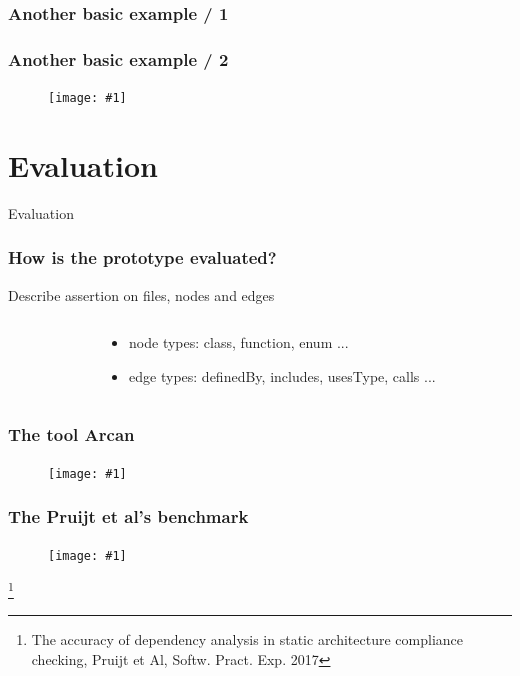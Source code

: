 \documentclass[table]{beamer}
\newcommand{\putimage}[2] {
  \begin{figure}[H]
    \centering
    \texttt{[image: \#1]}
	\end{figure}
}
\begin{document}
\begin{frame}[fragile]
  \frametitle{Another basic example / 1}
  
\end{frame}

\begin{frame}
  \frametitle{Another basic example / 2}
  \putimage{images/d2/dependency-graph-example.png}{0.99}
\end{frame}

\section{Evaluation}
\begin{frame}
  \centering
  \huge Evaluation
\end{frame}

\begin{frame}[fragile]
  \frametitle{How is the prototype evaluated?}
  Describe assertion on files, nodes and edges
  \begin{columns}
    \begin{column}{0.64\textwidth}
      
    \end{column}
    \begin{column}{0.34\textwidth}
      \begin{itemize}
        \item node types: class, function, enum ...
        \item edge types: definedBy, includes, usesType, calls ...
      \end{itemize}
    \end{column}
  \end{columns}
\end{frame}


\begin{frame}
  \frametitle{The tool Arcan}
  \putimage{images/plain/arcanDepgraph.png}{0.70}
\end{frame}

\begin{frame}
  \frametitle{The Pruijt et al's benchmark}
  \putimage{images/py/prototype-arcan-pruijt.png}{0.80}

	\footnote{The accuracy of dependency analysis in static architecture compliance checking, Pruijt et Al, Softw. Pract. Exp. 2017}
\end{frame}
\end{document}
